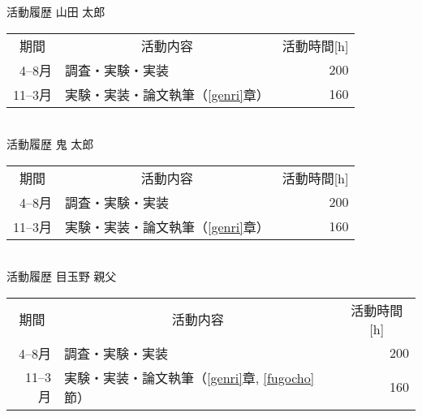 

\thispagestyle{empty}

\begin{table}[tbp]
\large
\centering

{\gtfamily 活動履歴} 山田 太郎\\
\begin{tabular}{rlr}
\hline
\multicolumn{1}{c}{{\gtfamily 期間}}&
\multicolumn{1}{c}{{\gtfamily 活動内容}}&
\multicolumn{1}{c}{{\gtfamily 活動時間[h]}}
\\
4--8月 & 調査・実験・実装 & 200 \\
11--3月 & 実験・実装・論文執筆（\ref{genri}章） & 160\\
\hline
\end{tabular}\\
\vspace{2in}
{\gtfamily 活動履歴} 鬼 太郎\\
\begin{tabular}{rlr}
\hline
\multicolumn{1}{c}{{\gtfamily 期間}}&
\multicolumn{1}{c}{{\gtfamily 活動内容}}&
\multicolumn{1}{c}{{\gtfamily 活動時間[h]}}
\\
4--8月 & 調査・実験・実装 & 200 \\
11--3月 & 実験・実装・論文執筆（\ref{genri}章） & 160\\
\hline
\end{tabular}\\
\vspace{2in}
{\gtfamily 活動履歴} 目玉野 親父\\
\begin{tabular}{rlr}
\hline
\multicolumn{1}{c}{{\gtfamily 期間}}&
\multicolumn{1}{c}{{\gtfamily 活動内容}}&
\multicolumn{1}{c}{{\gtfamily 活動時間[h]}}
\\
4--8月 & 調査・実験・実装 & 200 \\
11--3月 & 実験・実装・論文執筆（\ref{genri}章, \ref{fugocho}節） & 160\\
\hline
\end{tabular}\\
\vspace{2in}
\end{table}
\clearpage
